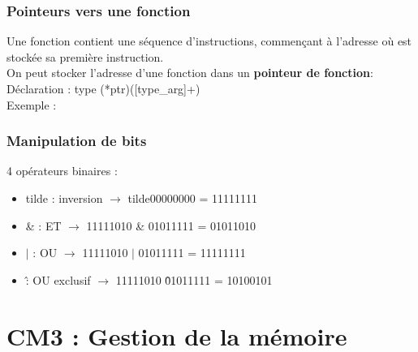 \documentclass{article}
\newcommand{\insertslide}[2]{
\begin{center}
    \fbox{\texttt{[image: \#1]}}
\end{center}
}
\begin{document}
        \subsubsection{Pointeurs vers une fonction}
            Une fonction contient une séquence d'instructions, commençant à l'adresse
            où est stockée sa première instruction.\\
            On peut stocker l'adresse d'une fonction dans un \textbf{pointeur de fonction}:\\
            Déclaration : type (*ptr)([type\_arg]+)\\
            Exemple :
            \insertslide{Slides/CM2.pdf}{50}
        
        \subsubsection{Manipulation de bits}
            4 opérateurs binaires :
            \begin{itemize}
                \item tilde : inversion $\rightarrow$ tilde00000000 = 11111111
                \item \& : ET $\rightarrow$ 11111010 \& 01011111 = 01011010
                \item $|$ : OU $\rightarrow$ 11111010 $|$ 01011111 = 11111111
                \item \^ : OU exclusif $\rightarrow$ 11111010 \^ 01011111 = 10100101
            \end{itemize}
\pagebreak
\section{CM3 : Gestion de la mémoire}
\end{document}
